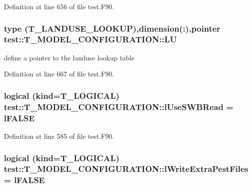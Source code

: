 Definition at line 656 of file test.F90.

\hypertarget{typetest_1_1_t___m_o_d_e_l___c_o_n_f_i_g_u_r_a_t_i_o_n_a2d94c6dd1c8fee154efbcd35a24f8763}{
\subsubsection[{LU}]{\setlength{\rightskip}{0pt plus 5cm}type ({\bf T\_\-LANDUSE\_\-LOOKUP}),dimension(:),pointer {\bf test::T\_\-MODEL\_\-CONFIGURATION::LU}}}
\label{typetest_1_1_t___m_o_d_e_l___c_o_n_f_i_g_u_r_a_t_i_o_n_a2d94c6dd1c8fee154efbcd35a24f8763}


define a pointer to the landuse lookup table 



Definition at line 667 of file test.F90.

\hypertarget{typetest_1_1_t___m_o_d_e_l___c_o_n_f_i_g_u_r_a_t_i_o_n_a6ebd10ca270bb3e7f099aaae209bf652}{
\subsubsection[{lUseSWBRead}]{\setlength{\rightskip}{0pt plus 5cm}logical (kind={\bf T\_\-LOGICAL}) {\bf test::T\_\-MODEL\_\-CONFIGURATION::lUseSWBRead} = {\bf lFALSE}}}
\label{typetest_1_1_t___m_o_d_e_l___c_o_n_f_i_g_u_r_a_t_i_o_n_a6ebd10ca270bb3e7f099aaae209bf652}


Definition at line 585 of file test.F90.

\hypertarget{typetest_1_1_t___m_o_d_e_l___c_o_n_f_i_g_u_r_a_t_i_o_n_a6b51e2f5c9172548b0d4ab207c83c366}{
\subsubsection[{lWriteExtraPestFiles}]{\setlength{\rightskip}{0pt plus 5cm}logical (kind={\bf T\_\-LOGICAL}) {\bf test::T\_\-MODEL\_\-CONFIGURATION::lWriteExtraPestFiles} = {\bf lFALSE}}}
\label{typetest_1_1_t___m_o_d_e_l___c_o_n_f_i_g_u_r_a_t_i_o_n_a6b51e2f5c9172548b0d4ab207c83c366}


